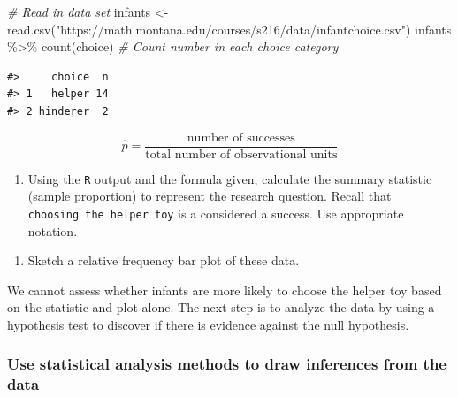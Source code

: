 \documentclass[
]{report}
\newenvironment{Shaded}{\begin{snugshade}}{\end{snugshade}}
\newcommand{\CommentTok}[1]{\textcolor[rgb]{0.56,0.35,0.01}{\textit{#1}}}
\newcommand{\FunctionTok}[1]{\textcolor[rgb]{0.00,0.00,0.00}{#1}}
\newcommand{\NormalTok}[1]{#1}
\newcommand{\OtherTok}[1]{\textcolor[rgb]{0.56,0.35,0.01}{#1}}
\newcommand{\SpecialCharTok}[1]{\textcolor[rgb]{0.00,0.00,0.00}{#1}}
\newcommand{\StringTok}[1]{\textcolor[rgb]{0.31,0.60,0.02}{#1}}
\providecommand{\tightlist}{%
  \setlength{\itemsep}{0pt}\setlength{\parskip}{0pt}}
\begin{document}
\begin{Shaded}
\begin{Highlighting}[]
 \CommentTok{\# Read in data set}
\NormalTok{infants }\OtherTok{\textless{}{-}} \FunctionTok{read.csv}\NormalTok{(}\StringTok{"https://math.montana.edu/courses/s216/data/infantchoice.csv"}\NormalTok{)}
\NormalTok{infants }\SpecialCharTok{\%\textgreater{}\%} \FunctionTok{count}\NormalTok{(choice)  }\CommentTok{\# Count number in each choice category}
\end{Highlighting}
\end{Shaded}

\begin{verbatim}
#>     choice  n
#> 1   helper 14
#> 2 hinderer  2
\end{verbatim}

\[\hat{p} = \frac{\mbox{number of successes}}{\mbox{total number of observational units}}\]
\newpage

\begin{enumerate}
\def\labelenumi{\arabic{enumi}.}
\setcounter{enumi}{2}
\tightlist
\item
  Using the \texttt{R} output and the formula given, calculate the summary statistic (sample proportion) to represent the research question. Recall that \texttt{choosing\ the\ helper\ toy} is a considered a success. Use appropriate notation.
\end{enumerate}

\vspace{0.5in}

\begin{enumerate}
\def\labelenumi{\arabic{enumi}.}
\setcounter{enumi}{3}
\tightlist
\item
  Sketch a relative frequency bar plot of these data.
\end{enumerate}

\vspace{1.5in}

We cannot assess whether infants are more likely to choose the helper toy based on the statistic and plot alone. The next step is to analyze the data by using a hypothesis test to discover if there is evidence against the null hypothesis.

\hypertarget{use-statistical-analysis-methods-to-draw-inferences-from-the-data}{%
\subsubsection*{Use statistical analysis methods to draw inferences from the data}\label{use-statistical-analysis-methods-to-draw-inferences-from-the-data}}
\end{document}
